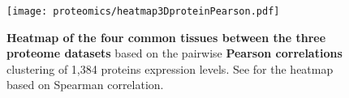 \begin{comment}
\pancreas\ & ENSG00000010438 & \gene{PRSS3} \\
\pancreas\ & ENSG00000114204 & \gene{SERPINI2} \\
\pancreas\ & ENSG00000141086 & \gene{CTRL} \\
\pancreas\ & ENSG00000143954 & \gene{REG3G} \\
\pancreas\ & ENSG00000187021 & \gene{PNLIPRP1} \\
\pancreas\ & ENSG00000215704 & \gene{CELA2B} \\
\pancreas\ & ENSG00000266200 & \gene{PNLIPRP2} \\
\placenta\ & ENSG00000105825 & \gene{TFPI2} \\
\placenta\ & ENSG00000116183 & \gene{PAPPA2} \\
\placenta\ & ENSG00000137868 & \gene{STRA6} \\
\placenta\ & ENSG00000148848 & \gene{ADAM12} \\
\placenta\ & ENSG00000163283 & \gene{ALPP} \\
\placenta\ & ENSG00000172296 & \gene{SPTLC3} \\
\placenta\ & ENSG00000172901 &  \\
\placenta\ & ENSG00000183668 & \gene{PSG9} \\
\placenta\ & ENSG00000243137 & \gene{PSG4} \\
\prostate\ & ENSG00000044524 & \gene{EPHA3} \\
\prostate\ & ENSG00000103710 & \gene{RASL12} \\
\rectum\   & ENSG00000205277 & \gene{MUC12} \\
\testis\   & ENSG00000052841 & \gene{TTC17} \\
\testis\   & ENSG00000109762 & \gene{SNX25} \\
\testis\   & ENSG00000130948 & \gene{HSD17B3} \\
\testis\   & ENSG00000160310 & \gene{PRMT2} \\* \bottomrule
\end{longtable}
\end{comment}
\begin{figure}[!htbp]
    \texttt{[image: proteomics/heatmap3DproteinPearson.pdf]}\centering
    \vspace{-4mm}
    \caption[Heatmap of the 4 common tissues between the three proteome
    datasets (Pearson correlation)]{\label{fig:prot3DheatmapPears}\textbf{Heatmap
    of the four common tissues between the three proteome datasets}
    based on the pairwise \textbf{Pearson correlations} clustering of
    1,384 proteins expression levels.
    See  for the heatmap based on Spearman correlation.}
\end{figure}

